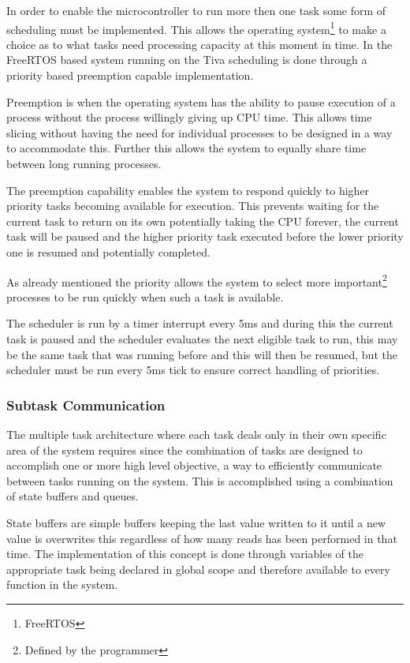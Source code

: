 \documentclass[../../../main]{subfiles}
\begin{document}
In order to enable the microcontroller to run more then one task some form of scheduling must be implemented. This allows the operating system\footnote{FreeRTOS} to make a choice as to what tasks need processing capacity at this moment in time. In the FreeRTOS based system running on the Tiva scheduling is done through a priority based preemption capable implementation.

Preemption is when the operating system has the ability to pause execution of a process without the process willingly giving up CPU time. This allows time slicing without having the need for individual processes to be designed in a way to accommodate this. Further this allows the system to equally share time between long running processes.

The preemption capability enables the system to respond quickly to higher priority tasks becoming available for execution. This prevents waiting for the current task to return on its own potentially taking the CPU forever, the current task  will be paused and the higher priority task executed before the lower priority one is resumed and potentially completed.

As already mentioned the priority allows the system to select more important\footnote{Defined by the programmer} processes to be run quickly when such a task is available. 

The scheduler is run by a timer interrupt every 5ms and during this the current task is paused and the scheduler evaluates the next eligible task to run, this may be the same task that was running before and this will then be resumed, but the scheduler must be run every 5ms tick to ensure correct handling of priorities.

\subsubsection{Subtask Communication}

The multiple task architecture where each task deals only in their own specific area of the system requires since the combination of tasks are designed to accomplish one or more high level objective, a way to efficiently communicate between tasks running on the system.
This is accomplished using a combination of state buffers and queues.

State buffers are simple buffers keeping the last value written to it until a new value is overwrites this regardless of how many reads has been performed in that time. The implementation of this concept is done through variables of the appropriate task being declared in global scope and therefore available to every function in the system.
\end{document}
